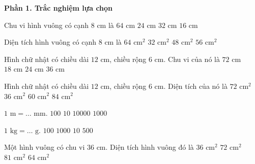 \textbf{Phần 1. Trắc nghiệm lựa chọn}

\begin{ex} %
Chu vi hình vuông có cạnh $8\text{ cm}$ là
\choice
{$64\text{ cm}$}
{$24\text{ cm}$}
{\True $32\text{ cm}$}
{$16\text{ cm}$}
\end{ex}

\begin{ex} %
Diện tích hình vuông có cạnh $8\text{ cm}$ là
\choice
{\True $64\text{ cm}^2$}
{$32\text{ cm}^2$}
{$48\text{ cm}^2$}
{$56\text{ cm}^2$}
\end{ex}

\begin{ex} %
Hình chữ nhật có chiều dài $12\text{ cm}$, chiều rộng $6\text{ cm}$. Chu vi của nó là
\choice
{$72\text{ cm}$}
{$18\text{ cm}$}
{$24\text{ cm}$}
{\True $36\text{ cm}$}
\end{ex}

\begin{ex} %
Hình chữ nhật có chiều dài $12\text{ cm}$, chiều rộng $6\text{ cm}$. Diện tích của nó là
\choice
{\True $72\text{ cm}^2$}
{$36\text{ cm}^2$}
{$60\text{ cm}^2$}
{$84\text{ cm}^2$}
\end{ex}

\begin{ex} %
$1\text{ m} = \dots\text{ mm}$.
\choice
{$100$}
{$10$}
{$10000$}
{\True $1000$}
\end{ex}

\begin{ex} %
$1\text{ kg} = \dots\text{ g}$.
\choice
{$100$}
{\True $1000$}
{$10$}
{$500$}
\end{ex}

\begin{ex} %
Một hình vuông có chu vi $36\text{ cm}$. Diện tích hình vuông đó là
\choice
{$36\text{ cm}^2$}
{$72\text{ cm}^2$}
{\True $81\text{ cm}^2$}
{$64\text{ cm}^2$}
\end{ex}

